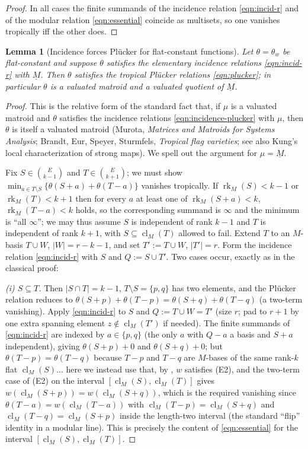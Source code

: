 \documentclass{article}
\newtheorem{lemma}[theorem]{Lemma}
\theoremstyle{definition}
\newcommand{\rk}{\operatorname{rk}}
\newcommand{\cl}{\operatorname{cl}}
\begin{document}
\begin{proof}
In all cases the finite summands of the incidence relation \eqref{eqn:incid-r} and of the modular
relation \eqref{eqn:essential} coincide as multisets, so one vanishes tropically iff the other does.
\end{proof}

\begin{lemma}[Incidence forces Pl\"ucker for flat-constant functions]\label{lem:incid-plucker}
Let $\theta=\theta_w$ be flat-constant and suppose $\theta$ satisfies the elementary incidence
relations \eqref{eqn:incid-r} with $\underline M$. Then $\theta$ satisfies the tropical Pl\"ucker
relations \eqref{eqn:plucker}; in particular $\theta$ is a valuated matroid and a valuated quotient
of $\underline M$.
\end{lemma}

\begin{proof}
This is the relative form of the standard fact that, if $\mu$ is a valuated matroid and
$\theta$ satisfies the incidence relations \eqref{eqn:incidence-plucker} with $\mu$, then $\theta$ is
itself a valuated matroid (Murota, \emph{Matrices and Matroids for Systems Analysis}; Brandt,
Eur, Speyer, Sturmfels, \emph{Tropical flag varieties}; see also Kung's local characterization of
strong maps). We spell out the argument for $\mu=\underline M$.

Fix $S\in\binom{E}{k-1}$ and $T\in\binom{E}{k+1}$; we must show
$\min_{a\in T\setminus S}\{\theta(S+a)+\theta(T-a)\}$ vanishes tropically. If $\rk_M(S)<k-1$ or
$\rk_M(T)<k+1$ then for every $a$ at least one of $\rk_M(S+a)<k$, $\rk_M(T-a)<k$ holds, so the
corresponding summand is $\infty$ and the minimum is ``all $\infty$''; we may thus assume $S$ is
independent of rank $k-1$ and $T$ is independent of rank $k+1$, with $S\subseteq\cl_M(T)$ allowed to
fail. Extend $T$ to an $M$-basis $T\cup W$, $|W|=r-k-1$, and set $T':=T\cup W$, $|T'|=r$. Form the
incidence relation \eqref{eqn:incid-r} with $S$ and $Q:=S\cup T'$. Two cases occur, exactly as in the
classical proof:

\emph{(i) $S\subseteq T$.} Then $|S\cap T|=k-1$, $T\setminus S=\{p,q\}$ has two elements, and the
Pl\"ucker relation reduces to $\theta(S+p)+\theta(T-p)=\theta(S+q)+\theta(T-q)$ (a two-term
vanishing). Apply \eqref{eqn:incid-r} to $S$ and $Q:=T\cup W=T'$ (size $r$; pad to $r+1$ by one extra
spanning element $z\notin\cl_M(T')$ if needed). The finite summands of \eqref{eqn:incid-r} are
indexed by $a\in\{p,q\}$ (the only $a$ with $Q-a$ a basis and $S+a$ independent), giving
$\theta(S+p)+0$ and $\theta(S+q)+0$; but $\theta(T-p)=\theta(T-q)$ because $T-p$ and $T-q$ are
$M$-bases of the same rank-$k$ flat $\cl_M(S)$... here we instead use that, by
, $w$ satisfies (E2), and the two-term case of (E2) on the interval
$[\cl_M(S),\cl_M(T)]$ gives $w(\cl_M(S+p))=w(\cl_M(S+q))$, which is the required vanishing since
$\theta(T-a)=w(\cl_M(T-a))$ with $\cl_M(T-p)=\cl_M(S+q)$ and $\cl_M(T-q)=\cl_M(S+p)$ inside the
length-two interval (the standard ``flip'' identity in a modular line). This is precisely the content
of \eqref{eqn:essential} for the interval $[\cl_M(S),\cl_M(T)]$.


\end{proof}
\end{document}
